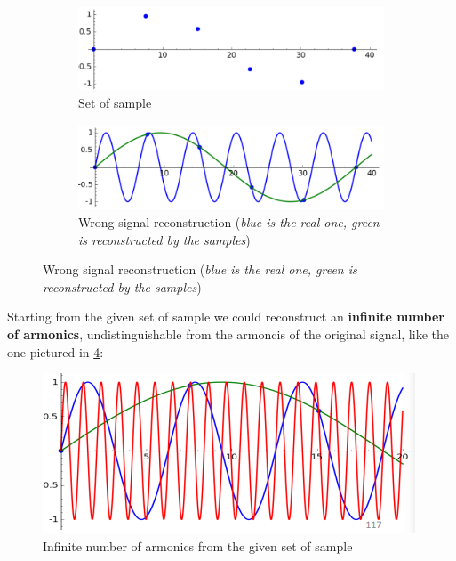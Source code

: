 \documentclass[10pt,a4paper]{report}
\theoremstyle{definition}
\begin{document}
\begin{figure}[h]
	\centering
	\begin{subfigure}{.5\textwidth}
		\centering
		\includegraphics[width=.9\linewidth]{images/Pasted image 20230526115252.png}
		\caption{Set of sample}
	\label{sample-eg-1}
	\end{subfigure}%
	\begin{subfigure}{.5\textwidth}
		\centering
		\includegraphics[width=.9\linewidth]{images/Pasted image 20230526115356.png}
		\caption{Wrong signal reconstruction (\textit{blue is the real one, green is reconstructed by the samples})}
	\label{sample-eg-1-reconstruct}
	\end{subfigure}


\end{figure}


Starting from the given set of sample we could reconstruct an \textbf{infinite number of armonics}, undistinguishable from the armoncis of the original signal, like the one pictured in \ref{infinite-reconstruct}:
\begin{figure}[h!]
	\centering\includegraphics[scale=0.50]{images/Pasted image 20230526115550.png}
	\caption{Infinite number of armonics from the given set of sample}
	\label{infinite-reconstruct}
\end{figure}
\end{document}
